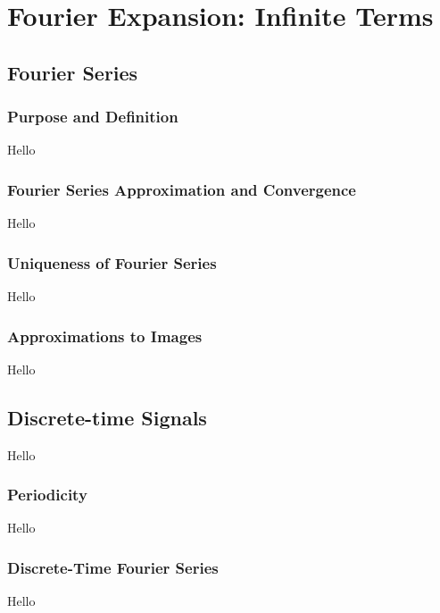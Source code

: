 \chapter{Fourier Expansion: Infinite Terms}

\section{Fourier Series}
\subsection{Purpose and Definition}
Hello

\subsection{Fourier Series Approximation and Convergence}
Hello

\subsection{Uniqueness of Fourier Series}
Hello

\subsection{Approximations to Images}
Hello

\section{Discrete-time Signals}
Hello

\subsection{Periodicity}
Hello

\subsection{Discrete-Time Fourier Series}
Hello
